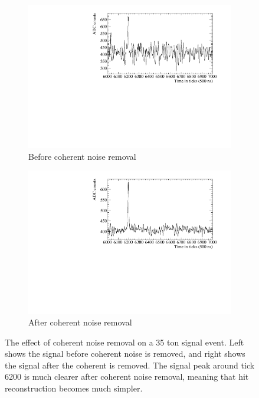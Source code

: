 \begin{figure}[h!]
  \centering
  \begin{subfigure}{0.48\textwidth}
    \centering
    \includegraphics[width=\textwidth]{BeforeCoherent}
    \caption{Before coherent noise removal}
  \end{subfigure}%
  \hspace{0.03\textwidth}%
  \begin{subfigure}{0.48\textwidth}
    \centering
    \includegraphics[width=\textwidth]{AfterCoherent}
    \caption{After coherent noise removal}
  \end{subfigure}
  \caption[Removing coherent noise in the 35 ton]
          {The effect of coherent noise removal on a 35 ton signal event. Left shows the signal before coherent noise is removed, and right shows the signal after the coherent is removed. The signal peak around tick 6200 is much clearer after coherent noise removal, meaning that hit reconstruction becomes much simpler.}
  \label{fig:CoherentNoise}
\end{figure}

